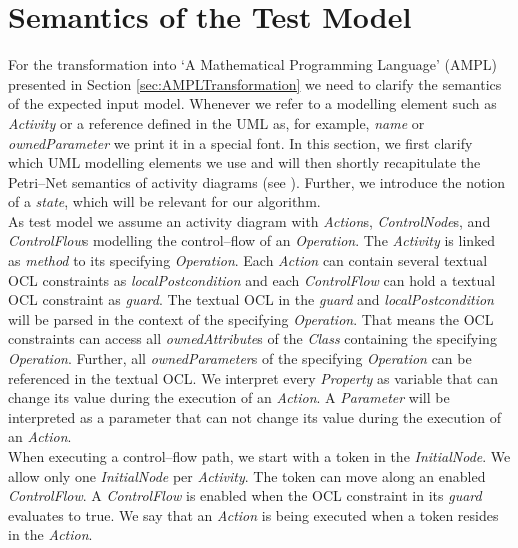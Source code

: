 \documentclass[runningheads,a4paper]{llncs}%
\newcommand{\UMLType}[1]{\textsf{\textit{#1}}} %
\newcommand{\UMLReference}[1]{\textsf{\textit{#1}}} %
\begin{document}
\section{Semantics of the Test Model}%
\label{sec:TestModel}%
For the transformation into `A Mathematical Programming Language' (AMPL) presented in Section \ref{sec:AMPLTransformation} we need to clarify the semantics of the expected input model. Whenever we refer to a modelling element such as \UMLType{Activity} or a reference defined in the UML as, for example, \UMLReference{name} or \UMLReference{ownedParameter} we print it in a special font. In this section, we first clarify which UML modelling elements we use and will then shortly recapitulate the Petri--Net semantics of activity diagrams (see \cite{UML23Superstructure}). Further, we introduce the notion of a \emph{state}, which will be relevant for our algorithm.\\%
As test model we assume an activity diagram with \UMLType{Action}s, \UMLType{ControlNode}s, and \UMLType{ControlFlow}s modelling the control--flow of an \UMLType{Operation}. The \UMLType{Activity} is linked as \UMLReference{method} to its specifying \UMLType{Operation}. Each \UMLType{Action} can contain several textual OCL constraints as \UMLReference{localPostcondition} and each \UMLType{ControlFlow} can hold a textual OCL constraint as \UMLReference{guard}. The textual OCL in the \UMLReference{guard} and \UMLReference{localPostcondition} will be parsed in the context of the specifying \UMLType{Operation}. That means the OCL constraints can access all \UMLReference{ownedAttribute}s of the \UMLType{Class} containing the specifying \UMLType{Operation}. Further, all \UMLReference{ownedParameter}s of the specifying \UMLType{Operation} can be referenced in the textual OCL. We interpret every \UMLType{Property} as variable that can change its value during the execution of an \UMLType{Action}. A \UMLType{Parameter} will be interpreted as a parameter that can not change its value during the execution of an \UMLType{Action}.\\%
When executing a control--flow path, we start with a token in the \UMLType{InitialNode}. We allow only one \UMLType{InitialNode} per \UMLType{Activity}. The token can move along an enabled \UMLType{ControlFlow}. A \UMLType{ControlFlow} is enabled when the OCL constraint in its \UMLReference{guard} evaluates to true. We say that an \UMLType{Action} is being executed when a token resides in the \UMLType{Action}.\\%
\end{document}
